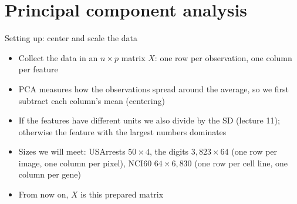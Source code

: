 

\section{Principal component analysis}

\begin{frame}{Setting up: center and scale the data}
    \begin{itemize}
        \item Collect the data in an $n \times p$ matrix $X$: one row per observation, one column per feature
        \item PCA measures how the observations spread around the average, so we first subtract each column's mean (centering)
        \item If the features have different units we also divide by the SD (lecture 11); otherwise the feature with the largest numbers dominates
        \item Sizes we will meet: USArrests $50 \times 4$, the digits $3{,}823 \times 64$ (one row per image, one column per pixel), NCI60 $64 \times 6{,}830$ (one row per cell line, one column per gene)
        \item From now on, $X$ is this prepared matrix
    \end{itemize}
\end{frame}

